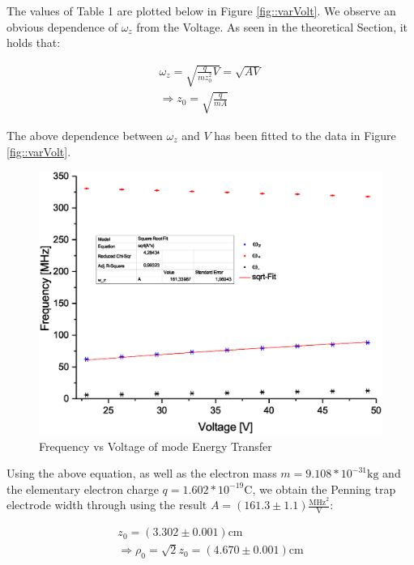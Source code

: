 \documentclass[12pt]{article}
\begin{document}
The values of Table 1 are plotted below in Figure \eqref{fig::varVolt}. We observe an obvious dependence of $\omega_z$ from the Voltage. As seen in the theoretical Section, it holds that:

\begin{equation*}
\begin{aligned}
\omega_z = \sqrt{\frac{q}{m z_0^2}V} = \sqrt{A V} \\
\Rightarrow z_0 = \sqrt{\frac{q}{m A}}
\end{aligned}
\end{equation*}

The above dependence between $\omega_z$ and $V$ has been fitted to the data in Figure \eqref{fig::varVolt}.

\begin{figure}[h]
  \centering
  \includegraphics[width=20cm,bbllx=112,bburx=447,bblly=264,bbury=582]{Graph3.eps}
  \caption{Frequency vs Voltage of mode Energy Transfer}
  \label{fig::varVolt}
\end{figure}

Using the above equation, as well as the electron mass $m = 9.108*10^{-31} \text{kg}$ and the elementary electron charge $q = 1.602*10^{-19}\text{C}$, we obtain the Penning trap electrode width through using the result $A = (161.3 \pm 1.1) \frac{\text{MHz}^2}{\text{V}}$:

\begin{equation*}
\begin{aligned}
z_0 = (3.302 \pm 0.001) \text{cm} \\
\Rightarrow \rho_0 = \sqrt{2}z_0 = (4.670 \pm 0.001) \text{cm}
\end{aligned}
\end{equation*} 
\end{document}
